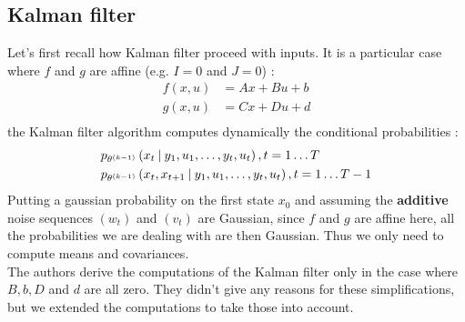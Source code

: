 \subsection{Kalman filter}
Let's first recall how Kalman filter proceed with inputs. It is a particular case where $f$ and $g$ are affine (e.g. $I=0$ and $J=0$) :
\begin{align*}
  f(x,u) &= Ax + Bu + b\\
  g(x,u) &= Cx + Du + d\\
\end{align*}
the Kalman filter algorithm computes dynamically the conditional probabilities :
\begin{align*}
  &p_{\theta^{(k-1)}}\left(x_t \mathbin{\vert} y_1, u_1, \ldots, y_t, u_t \right), t=1 \ldots T\\
  &p_{\theta^{(k-1)}}\left(x_t, x_{t+1} \mathbin{\vert} y_1, u_1, \ldots, y_t, u_t \right), t=1 \ldots T-1\\
\end{align*}
Putting a gaussian probability on the first state $x_0$ and assuming the \textbf{additive} noise sequences $(w_t)$ and $(v_t)$ are Gaussian, since $f$ and $g$ are affine here, all the probabilities we are dealing with are then Gaussian.
Thus we only need to compute means and covariances.\\

The authors derive the computations of the Kalman filter only in the case where $B,b,D$ and $d$ are all zero.
They didn't give any reasons for these simplifications, but we extended the computations to take those into account.\\


